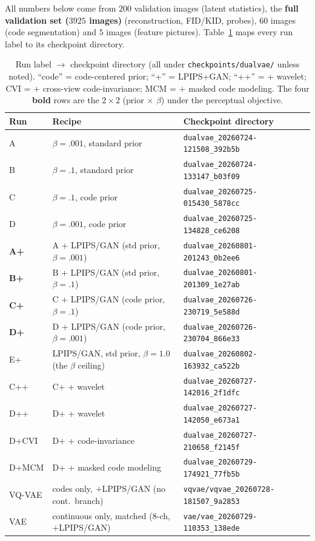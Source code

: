 \documentclass[11pt]{article}
\begin{document}
All numbers below come from $200$ validation images (latent statistics), the \textbf{full
validation set ($3925$ images)} (reconstruction, FID/KID, probes), $60$ images (code
segmentation) and $5$ images (feature pictures). Table~\ref{tab:ckpts} maps every run label to
its checkpoint directory.

\begin{table}[h]
\centering
\caption{Run label $\to$ checkpoint directory (all under
\texttt{checkpoints/dualvae/} unless noted). ``code'' = code-centered prior; ``+'' = LPIPS+GAN;
``++'' = + wavelet; CVI = + cross-view code-invariance; MCM = + masked code modeling.
The four \textbf{bold} rows are the $2\times2$ (prior $\times$ $\beta$) under the perceptual
objective.}
\label{tab:ckpts}
\small
\begin{tabular}{lll}
\toprule
Run & Recipe & Checkpoint directory\\
\midrule
A     & $\beta{=}.001$, standard prior      & \texttt{dualvae\_20260724-121508\_392b5b}\\
B     & $\beta{=}.1$, standard prior        & \texttt{dualvae\_20260724-133147\_b03f09}\\
C     & $\beta{=}.1$, code prior            & \texttt{dualvae\_20260725-015430\_5878cc}\\
D     & $\beta{=}.001$, code prior          & \texttt{dualvae\_20260725-134828\_ce6208}\\
\midrule
\textbf{A+} & A + LPIPS/GAN (std prior, $\beta{=}.001$) & \texttt{dualvae\_20260801-201243\_0b2ee6}\\
\textbf{B+} & B + LPIPS/GAN (std prior, $\beta{=}.1$)   & \texttt{dualvae\_20260801-201309\_1e27ab}\\
\textbf{C+} & C + LPIPS/GAN (code prior, $\beta{=}.1$)  & \texttt{dualvae\_20260726-230719\_5e588d}\\
\textbf{D+} & D + LPIPS/GAN (code prior, $\beta{=}.001$)& \texttt{dualvae\_20260726-230704\_866e33}\\
\midrule
E+    & LPIPS/GAN, std prior, $\beta{=}1.0$ (the $\beta$ ceiling) & \texttt{dualvae\_20260802-163932\_ca522b}\\
\midrule
C++   & C+ + wavelet                        & \texttt{dualvae\_20260727-142016\_2f1dfc}\\
D++   & D+ + wavelet                        & \texttt{dualvae\_20260727-142050\_e673a1}\\
D+CVI & D+ + code-invariance                & \texttt{dualvae\_20260727-210658\_f2145f}\\
D+MCM & D+ + masked code modeling           & \texttt{dualvae\_20260729-174921\_77fb5b}\\
VQ-VAE & codes only, $+$LPIPS/GAN (no cont.\ branch) & \texttt{vqvae/vqvae\_20260728-181507\_9a2853}\\
VAE   & continuous only, matched (8-ch, $+$LPIPS/GAN) & \texttt{vae/vae\_20260729-110353\_138ede}\\
\bottomrule
\end{tabular}
\end{table}
\end{document}
